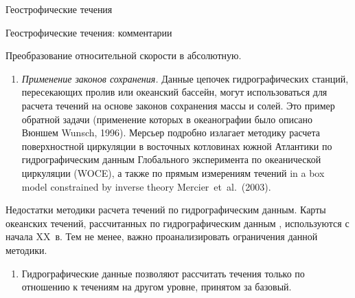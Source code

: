 \begin{chapter}{Геострофические течения}
\begin{section}{Геострофические течения: комментарии}
\begin{paragraph}{Преобразование относительной скорости в абсолютную. }
\begin{enumerate}
\item
\emph{Применение законов сохранения.} Данные цепочек гидрографических
станций, пересекающих пролив или 
океанский бассейн, могут использоваться для расчета течений на основе
законов сохранения массы и солей. Это пример обратной задачи (применение 
которых в океанографии было описано Вюншем Wunsch, 1996). 
Мерсьер подробно излагает методику расчета поверхностной
циркуляции в восточных котловинах южной Атлантики по гидрографическим данным 
Глобального эксперимента по океанической циркуляции (WOCE), 
а также по прямым измерениям течений in a box model 
constrained by inverse theory Mercier~et~al.~(2003).
%
\end{enumerate}
\end{paragraph}

\begin{paragraph}{Недостатки методики расчета течений по гидрографическим данным.}
Карты океанских течений, рассчитанных по гидрографическим данным%
,
используются с начала XX~в. Тем не менее, важно проанализировать
ограничения данной методики.
%

\begin{enumerate}
\item
Гидрографические данные
позволяют рассчитать течения только по отношению к течениям на другом уровне, 
принятом за базовый.
%


\end{enumerate}
\end{paragraph}
\end{section}
\end{chapter}
